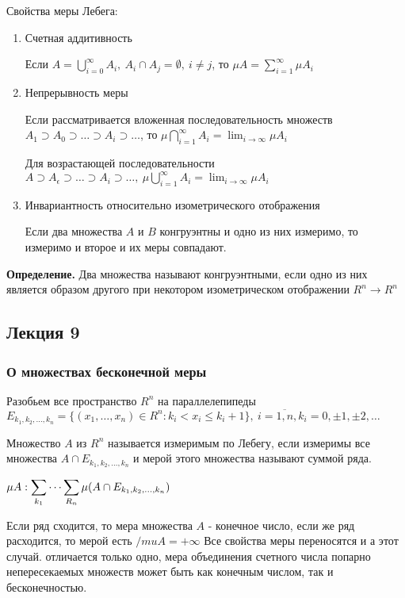 \documentclass[12pt]{report}
\newcommand{\be}{\begin{enumerate}}
\newcommand{\ee}{\end{enumerate}}
\renewcommand{\[}{$\\\displaystyle}
\renewcommand{\]}{\\$}
\renewcommand{\[}{$\\\displaystyle}
\newcommand{\sep}{,\ }
\newcommand{\tdef}{\textbf{Определение.} }
\begin{document}
Свойства меры Лебега:
\be
  \item Счетная аддитивность

  Если $A=\bigcup _{i=0}^\infty A_i\sep A_i\cap A_j=\emptyset\sep i\neq j$, то $\mu A=\sum_{i=1}^\infty \mu A_i$

  \item Непрерывность меры

  Если рассматривается вложенная последовательность множеств $A_1 \supset A_0 \supset \dots \supset A_i \supset \dots$, то $\mu\bigcap _{i=1}^\infty A_i=\lim_{i \rightarrow \infty} \mu A_i $

  Для возрастающей последовательности $A \supset A _ \epsilon \supset \dots \supset A_i \supset \dots \sep \mu \bigcup _ {i = 1}  ^ \infty A_i = \lim_{i \rightarrow \infty} \mu A_i$

  \item Инвариантность относительно изометрического отображения

  Если два множества $A$ и $B$ конгруэнтны и одно из них измеримо, то измеримо и второе и их меры совпадают.
\ee

\tdef Два множества называют конгруэнтными, если одно из них является образом другого при некотором изометрическом отображении $R^n \rightarrow R^n$

\subsection{Лекция 9}

\subsubsection{О множествах бесконечной меры}

Разобьем все пространство $R^n$ на параллелепипеды $E_{k_1,k_2,\dots,k_n}=\{(x_1,\dots,x_n) \in R^n:k_i<x_i \leq k_i+1 \} \sep i=\overline{1,n}, k_i=0, \pm 1, \pm 2, \dots$

Множество $A$ из $R^n$ называется измеримым по Лебегу, если измеримы все множества $A \cap E_{k_1,k_2,\dots,k_n}$ и мерой этого множества называют суммой ряда.

\[\mu A: \sum_{k_1} \dots \sum_{R_n} \mu (A \cap E_{k_1,k_2,\dots,k_n})\]

Если ряд сходится, то мера множества $A$ - конечное число, если же ряд расходится, то мерой есть $/mu A = + \infty$ Все свойства меры переносятся и а этот случай. отличается только одно, мера объединения счетного числа попарно непересекаемых множеств может быть как конечным числом, так и бесконечностью.
\end{document}
